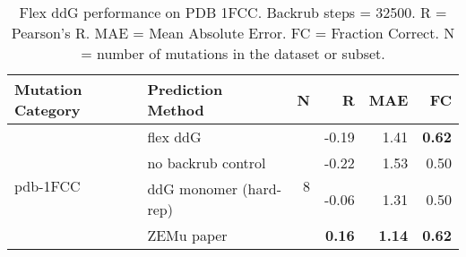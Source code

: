 \begin{table}
  \begin{tabular}{llrrrr}
\toprule
Mutation Category &       Prediction Method &  N &     R &  MAE &   FC \\
\midrule
 \multirow{ 4}{*}{pdb-1FCC} & flex ddG & \multirow{ 4}{*}{8} & -0.19 & 1.41 & \textbf{0.62}  \\
 & no backrub control & & -0.22 & 1.53 & 0.50  \\
 & ddG monomer (hard-rep) & & -0.06 & 1.31 & 0.50  \\
 & ZEMu paper & & \textbf{0.16} & \textbf{1.14} & \textbf{0.62}  \\
\bottomrule
\end{tabular}
  \caption[Flex ddG performance on PDB 1FCC]{
    Flex ddG performance on PDB 1FCC. Backrub steps = 32500. R = Pearson's R. MAE = Mean Absolute Error. FC = Fraction Correct. N = number of mutations in the dataset or subset.
  } \label{tab:table-pdb-1FCC}
\end{table}
